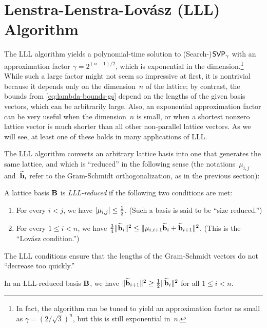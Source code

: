 \documentclass[11pt]{article}
\begin{document}
\section{Lenstra-Lenstra-Lov{\'a}sz (LLL) Algorithm}
\label{sec:lll-alg}

The LLL algorithm yields a polynomial-time solution to
(Search-)$\mathsf{SVP}_{\gamma}$ with an approximation factor
$\gamma = 2^{(n-1)/2}$, which is exponential in the
dimension.\footnote{In fact, the algorithm can be tuned to yield an
  approximation factor as small as $\gamma = (2/\sqrt{3})^{n}$, but
  this is still exponential in~$n$.} While such a large factor might
not seem so impressive at first, it is nontrivial because it depends
only on the dimension~$n$ of the lattice; by contrast, the bounds from
\cref{eq:lambda-bounds-gs} depend on the lengths of the given basis
vectors, which can be arbitrarily large. Also, an exponential
approximation factor can be very useful when the dimension~$n$ is
small, or when a shortest nonzero lattice vector is much shorter than
all other non-parallel lattice vectors. As we will see, at least one
of these holds in many applications of LLL.

The LLL algorithm converts an arbitrary lattice basis into one that
generates the same lattice, and which is ``reduced'' in the following
sense (the notations~$\mu_{i,j}$ and~$\widetilde{\mathbf{b}}_{i}$ refer to the
Gram-Schmidt orthogonalization, as in the previous section):

\begin{definition}
  \label{def:lll}
  A lattice basis $\mathbf{B}$ is \emph{LLL-reduced} if the following two
  conditions are met:
  \begin{enumerate}
  \item For every $i < j$, we have $\lvert\mu_{i,j}\rvert \leq \frac{1}{2}$.
    \hfill (Such a basis is said to be ``size reduced.'')
    
  \item For every $1 \leq i < n$, we have
    $\frac{3}{4}\lVert \widetilde{\mathbf{b}}_i\rVert^2 \leq
    \lVert\mu_{i,i+1}\widetilde{\mathbf{b}}_i + \widetilde{\mathbf{b}}_{i+1}\rVert^2$.
    \hfill (This is the ``Lov{\'a}sz condition.'')
  \end{enumerate}
\end{definition}

\noindent The LLL conditions ensure that the lengths of the
Gram-Schmidt vectors do not ``decrease too quickly.''

\begin{lemma}
  \label{lem:lll-gs}
  In an LLL-reduced basis $\mathbf{B}$, we have
  $\lVert\widetilde{\mathbf{b}}_{i+1}\rVert^{2} \geq \frac12
  \lVert\widetilde{\mathbf{b}}_{i}\rVert^{2}$ for all $1 \leq i < n$.
\end{lemma}
\end{document}
